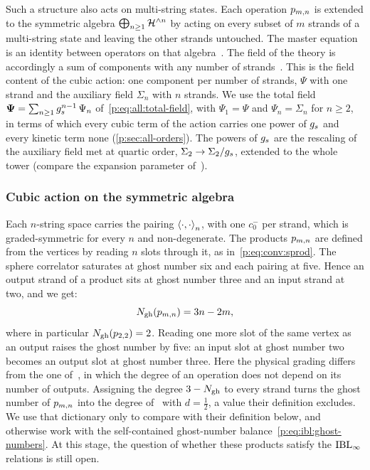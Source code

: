 Such a structure also acts on multi-string states.
Each operation $\sprod{m}{n}$ is extended to the symmetric algebra $\bigoplus_{n \ge 1} \Hn{n}$ by acting on every subset of $m$ strands of a multi-string state and leaving the other strands untouched.
The master equation is an identity between operators on that algebra~\cite{Cieliebak:2015:HomologicalAlgebraRelated, Muenster:2013:QuantumOpenClosedHomotopy}.
The field of the theory is accordingly a sum of components with any number of strands~\cite[sec.~9]{Cieliebak:2015:HomologicalAlgebraRelated}.
This is the field content of the cubic action: one component per number of strands, $\Psi$ with one strand and the auxiliary field $\Sigma_n$ with $n$ strands.
We use the total field $\boldsymbol{\Psi} = \sum_{n \ge 1} \gs^{n-1} \, \Psi_n$ of~\eqref{p:eq:all:total-field}, with $\Psi_1 = \Psi$ and $\Psi_n = \Sigma_n$ for $n \ge 2$, in terms of which every cubic term of the action carries one power of $\gs$ and every kinetic term none (\cref{p:sec:all-orders}).
  The powers of $\gs$ are the rescaling of the auxiliary field met at quartic order, $\Sigma_2 \to \Sigma_2 / \gs$, extended to the whole tower (compare the expansion parameter of~\cite[sec.~IV.B]{Muenster:2013:QuantumOpenClosedHomotopy}).

\subsubsection{Cubic action on the symmetric algebra}
\label{p:sec:ibl:symmetric-algebra}

Each $n$-string space carries the pairing $\pair[n]{\cdot}{\cdot}$, with one $c_0^-$ per strand, which is graded-symmetric for every $n$ and non-degenerate.
The products $\sprod{m}{n}$ are defined from the vertices by reading $n$ slots through it, as in~\eqref{p:eq:conv:sprod}.
The sphere correlator saturates at ghost number six and each pairing at five.
Hence an output strand of a product sits at ghost number three and an input strand at two, and we get:
\begin{equation}
  \label{p:eq:ibl:ghost-numbers}
  \Ngh(\sprod{m}{n})
    = 3 n - 2 m,
\end{equation}
where in particular $\Ngh(\sprod{2}{2}) = 2$.
Reading one more slot of the same vertex as an output raises the ghost number by five: an input slot at ghost number two becomes an output slot at ghost number three.
Here the physical grading differs from the one of~\cite{Cieliebak:2015:HomologicalAlgebraRelated}, in which the degree of an operation does not depend on its number of outputs.
Assigning the degree $3 - \Ngh$ to every strand turns the ghost number of $\sprod{m}{n}$ into the degree of~\cite{Cieliebak:2015:HomologicalAlgebraRelated} with $d = \tfrac{1}{2}$, a value their definition excludes.
We use that dictionary only to compare with their definition below, and otherwise work with the self-contained ghost-number balance~\eqref{p:eq:ibl:ghost-numbers}.
At this stage, the question of whether these products satisfy the $\IBL$ relations is still open.

